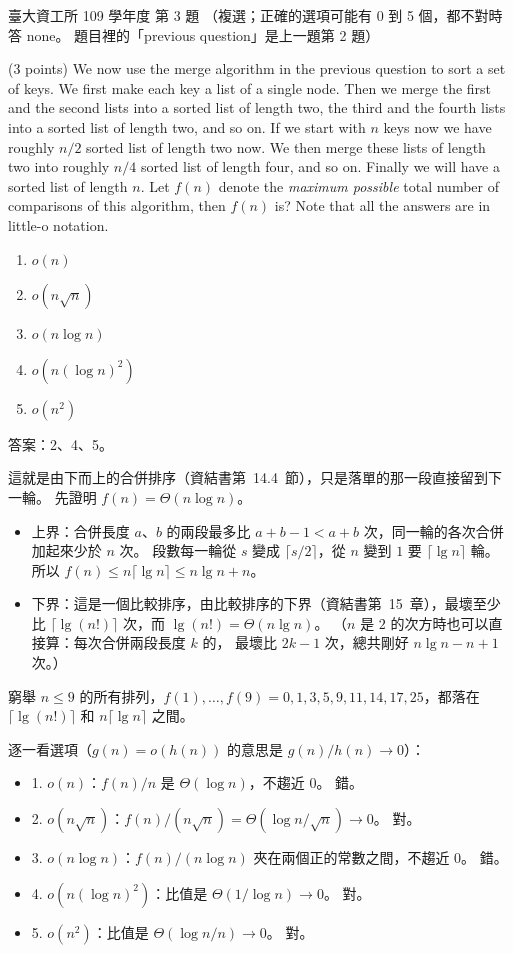 \begin{pastexam}[label={px:ntu-109-dsaa-03}]{臺大資工所 109 學年度 第 3 題}
（複選；正確的選項可能有 0 到 5 個，都不對時答 none。 題目裡的「previous question」是上一題第 2 題）

(3 points) We now use the merge algorithm in the previous question to sort a set of keys. We
first make each key a list of a single node. Then we merge the first and the second lists into a
sorted list of length two, the third and the fourth lists into a sorted list of length two, and
so on. If we start with $n$ keys now we have roughly $n/2$ sorted list of length two now. We then
merge these lists of length two into roughly $n/4$ sorted list of length four, and so on.
Finally we will have a sorted list of length $n$. Let $f(n)$ denote the \textit{maximum
possible} total number of comparisons of this algorithm, then $f(n)$ is? Note that all the
answers are in little-o notation.
\begin{enumerate}[label=\arabic*.]
\item $o(n)$
\item $o(n\sqrt{n})$
\item $o(n\log n)$
\item $o(n(\log n)^2)$
\item $o(n^2)$
\end{enumerate}
\end{pastexam}

\begin{pastsoln}
答案：2、4、5。

這就是由下而上的合併排序（資結書第~14.4~節），只是落單的那一段直接留到下一輪。 先證明
$f(n) = \Theta(n \log n)$。
\begin{itemize}
\item 上界：合併長度 $a$、$b$ 的兩段最多比 $a + b - 1 < a + b$ 次，同一輪的各次合併加起來少於 $n$ 次。
段數每一輪從 $s$ 變成 $\lceil s/2 \rceil$，從 $n$ 變到 $1$ 要 $\lceil \lg n \rceil$ 輪。 所以
$f(n) \le n \lceil \lg n \rceil \le n \lg n + n$。
\item 下界：這是一個比較排序，由比較排序的下界（資結書第~15~章），最壞至少比 $\lceil \lg(n!) \rceil$
次，而 $\lg(n!) = \Theta(n \lg n)$。 （$n$ 是 $2$ 的次方時也可以直接算：每次合併兩段長度 $k$ 的，
最壞比 $2k - 1$ 次，總共剛好 $n \lg n - n + 1$ 次。）
\end{itemize}
窮舉 $n \le 9$ 的所有排列，$f(1), \ldots, f(9) = 0, 1, 3, 5, 9, 11, 14, 17, 25$，都落在
$\lceil \lg(n!) \rceil$ 和 $n \lceil \lg n \rceil$ 之間。

逐一看選項（$g(n) = o(h(n))$ 的意思是 $g(n)/h(n) \to 0$）：
\begin{itemize}
\item 1. $o(n)$：$f(n)/n$ 是 $\Theta(\log n)$，不趨近 $0$。 錯。
\item 2. $o(n\sqrt{n})$：$f(n)/(n\sqrt{n}) = \Theta(\log n / \sqrt{n}) \to 0$。 對。
\item 3. $o(n \log n)$：$f(n)/(n \log n)$ 夾在兩個正的常數之間，不趨近 $0$。 錯。
\item 4. $o(n(\log n)^2)$：比值是 $\Theta(1/\log n) \to 0$。 對。
\item 5. $o(n^2)$：比值是 $\Theta(\log n / n) \to 0$。 對。
\end{itemize}
\end{pastsoln}
